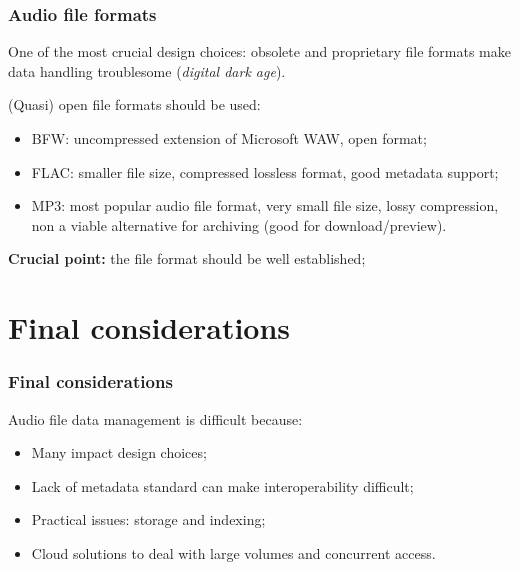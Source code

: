 \documentclass{beamer}
\newcommand\rb[1]{\textcolor{ThemeRed}{\textbf{#1}}}
\begin{document}
  \begin{frame}
    \frametitle{Audio file formats}
    
    One of the most crucial design choices: obsolete and proprietary file formats make data handling troublesome (\textit{digital dark age}).

    \vspace{1em}

    (Quasi) open file formats should be used:

    \vspace{0.5em}

    \begin{itemize}
      \itemsep0.5em
      \item BFW: uncompressed extension of Microsoft WAW, open format;
      \item FLAC: smaller file size, compressed lossless format, good metadata support;
      \item MP3: most popular audio file format, very small file size, lossy compression, non a viable alternative for archiving (good for download/preview).
    \end{itemize}

    \vspace{1em}

    \rb{Crucial point:} the file format should be well established;

  \end{frame}

  

\section{Final considerations}

  \begin{frame}
    \frametitle{Final considerations}
    
    Audio file data management is difficult because:
    
    \vspace{1em}
    
    \begin{itemize}
      \itemsep1em
      \item Many impact design choices;
      \item Lack of metadata standard can make interoperability difficult;
      \item Practical issues: storage and indexing;
      \item Cloud solutions to deal with large volumes and concurrent access.
    \end{itemize}

  \end{frame}
\end{document}

